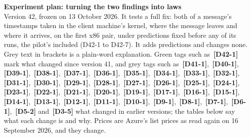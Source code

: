 \documentclass[11pt]{article}
\newcommand{\chg}[1]{\,{\color{chgcol}\bfseries\footnotesize[#1]}}
\newcommand{\chgold}[1]{\,{\color{oldcol}\bfseries\footnotesize[#1]}}
\begin{document}
{\LARGE\bfseries Experiment plan: turning the two findings into laws}\\[3pt]
{\large Version 42, frozen on 13 October 2026. It tests a full fix: both of a message's timestamps taken in the client machine's kernel, where the message leaves and where it arrives, on the first x86 pair, under predictions fixed before any of its runs, the pilot's included (D42-1 to D42-7). It adds predictions and changes none.}\\[4pt]
{\color{soft}\small Grey text in brackets is a plain-word explanation. Green tags such as \chg{D42-1} mark what changed since version 41, and grey tags such as \chgold{D41-1}, \chgold{D40-1}, \chgold{D39-1}, \chgold{D38-1}, \chgold{D37-1}, \chgold{D36-1}, \chgold{D35-1}, \chgold{D34-1}, \chgold{D33-1}, \chgold{D32-1}, \chgold{D31-1}, \chgold{D30-1}, \chgold{D29-1}, \chgold{D28-1}, \chgold{D27-1}, \chgold{D26-1}, \chgold{D25-1}, \chgold{D24-1}, \chgold{D23-1}, \chgold{D22-1}, \chgold{D21-1}, \chgold{D20-1}, \chgold{D19-1}, \chgold{D17-1}, \chgold{D16-1}, \chgold{D15-1}, \chgold{D14-1}, \chgold{D13-1}, \chgold{D12-1}, \chgold{D11-1}, \chgold{D10-1}, \chgold{D9-1}, \chgold{D8-1}, \chgold{D7-1}, \chgold{D6-1}, \chgold{D5-2} and \chgold{D3-5} what changed in earlier versions; the tables below say what each change is and why. Prices are Azure's list prices as read again on 16 September 2026, and they change.}
\end{document}
